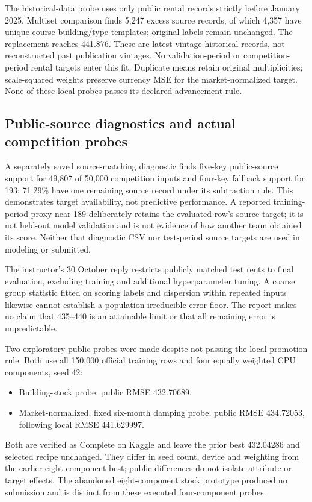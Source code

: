 The historical-data probe uses only public rental records\cite{hdb-rental} strictly before January 2025. Multiset comparison finds 5,247 excess source records, of which 4,357 have unique course building/type templates; original labels remain unchanged. The replacement reaches 441.876. These are latest-vintage historical records, not reconstructed past publication vintages. No validation-period or competition-period rental targets enter this fit. Duplicate means retain original multiplicities; scale-squared weights preserve currency MSE for the market-normalized target. None of these local probes passes its declared advancement rule.

\subsection{Public-source diagnostics and actual competition probes}
A separately saved source-matching diagnostic finds five-key public-source support for 49,807 of 50,000 competition inputs and four-key fallback support for 193; 71.29\% have one remaining source record under its subtraction rule. This demonstrates target availability, not predictive performance. A reported training-period proxy near 189 deliberately retains the evaluated row's source target; it is not held-out model validation and is not evidence of how another team obtained its score. Neither that diagnostic CSV nor test-period source targets are used in modeling or submitted.

The instructor's 30 October reply restricts publicly matched test rents to final evaluation, excluding training and additional hyperparameter tuning\cite{project-qa}. A coarse group statistic fitted on scoring labels and dispersion within repeated inputs likewise cannot establish a population irreducible-error floor. The report makes no claim that 435--440 is an attainable limit or that all remaining error is unpredictable.

Two exploratory public probes were made despite not passing the local promotion rule. Both use all 150,000 official training rows and four equally weighted CPU components, seed 42:
\begin{itemize}
\item Building-stock probe: public RMSE 432.70689.
\item Market-normalized, fixed six-month damping probe: public RMSE 434.72053, following local RMSE 441.629997.
\end{itemize}
Both are verified as Complete on Kaggle and leave the prior best 432.04286 and selected recipe unchanged. They differ in seed count, device and weighting from the earlier eight-component best; public differences do not isolate attribute or target effects. The abandoned eight-component stock prototype produced no submission and is distinct from these executed four-component probes.

